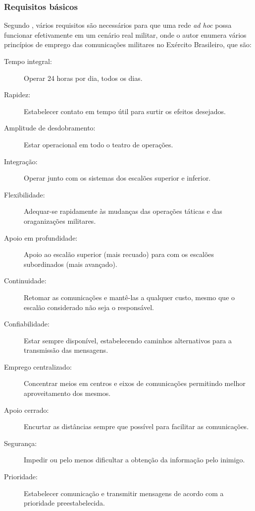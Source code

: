 \subsubsection{Requisitos b\'asicos}\label{requisitos}
Segundo \cite{salles}, v\'arios requisitos s\~ao necess\'arios para que uma rede \textit{ad hoc} possa funcionar efetivamente em um cen\'ario real militar, onde o autor enumera v\'arios princ\'ipios de emprego das comunica\c{c}\~oes militares no Ex\'ercito Brasileiro, que s\~ao:
\begin{description}
	\item[Tempo integral:] Operar 24 horas por dia, todos os dias.
	\item[Rapidez:] Estabelecer contato em tempo \'util para surtir os efeitos desejados.
	\item[Amplitude de desdobramento:] Estar operacional em todo o teatro de opera\c{c}\~oes.
	\item[Integra\c{c}\~ao:] Operar junto com os sistemas dos escal\~oes superior e inferior.
	\item[Flexibilidade:] Adequar-se rapidamente \`as mudan\c{c}as das opera\c{c}\~oes t\'aticas e das oraganiza\c{c}\~oes militares.
	\item[Apoio em profundidade:] Apoio ao escal\~ao superior (mais recuado) para com os escal\~oes subordinados (mais avan\c{c}ado).
	\item[Continuidade:] Retomar as comunica\c{c}\~oes e mant\^e-las a qualquer custo, mesmo que o escal\~ao considerado n\~ao seja o respons\'avel.
	\item[Confiabilidade:] Estar sempre dispon\'ivel, estabelecendo caminhos alternativos para a transmiss\~ao das mensagens.
	\item[Emprego centralizado:] Concentrar meios em centros e eixos de comunica\c{c}\~oes permitindo melhor aproveitamento dos mesmos.
	\item[Apoio cerrado:] Encurtar as dist\^ancias sempre que poss\'ivel para facilitar as comunica\c{c}\~oes.
	\item[Seguran\c{c}a:] Impedir ou pelo menos dificultar a obten\c{c}\~ao da informa\c{c}\~ao pelo inimigo.
	\item[Prioridade:] Estabelecer comunica\c{c}\~ao e transmitir mensagens de acordo com a prioridade preestabelecida.
\end{description}

